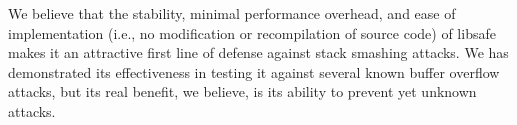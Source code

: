 \documentclass[]{article}
\newcommand{\compress}{
	\parskip 0in
	\topsep 0in
	\itemsep 0in
	\partopsep 0in
}
\begin{document}
We believe that the stability, minimal performance overhead, and ease of
implementation (i.e., no modification or recompilation of source code) of
libsafe makes it an attractive first line of defense against stack smashing
attacks.  We has demonstrated its effectiveness in testing it against several
known buffer overflow attacks, but its real benefit, we believe, is its ability
to prevent yet unknown attacks.



\begin{singlespace}
\compress

\end{singlespace}
\end{document}

